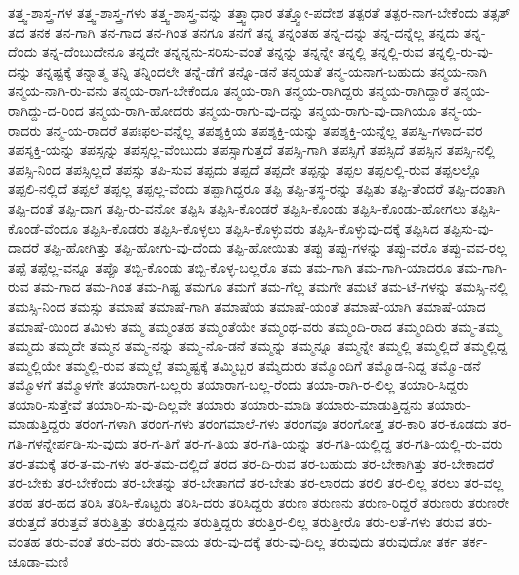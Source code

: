 {ತತ್ತ್ವ-ಶಾಸ್ತ್ರ-ಗಳ
ತತ್ತ್ವ-ಶಾಸ್ತ್ರ-ಗಳು
ತತ್ತ್ವ-ಶಾಸ್ತ್ರ-ವನ್ನು
ತತ್ತ್ವಾಧಾರ
ತತ್ತ್ವೋ-ಪದೇಶ
ತತ್ಪರತೆ
ತತ್ಪರ-ನಾಗ-ಬೇಕೆಂದು
ತತ್ಸತ್
ತದ
ತನಕ
ತನ-ಗಾಗಿ
ತನ-ಗಾದ
ತನ-ಗಿಂತ
ತನಗೂ
ತನಗೆ
ತನ್ನ
ತನ್ನಂತಹ
ತನ್ನ-ದನ್ನು
ತನ್ನ-ದನ್ನೆಲ್ಲ
ತನ್ನದು
ತನ್ನ-ದೆಂದು
ತನ್ನ-ದೆಂಬುದೇನೂ
ತನ್ನದೇ
ತನ್ನನ್ನನು-ಸರಿಸು-ವಂತೆ
ತನ್ನನ್ನು
ತನ್ನನ್ನೇ
ತನ್ನಲ್ಲಿ
ತನ್ನಲ್ಲಿ-ರುವ
ತನ್ನಲ್ಲಿ-ರು-ವು-ದನ್ನು
ತನ್ನಷ್ಟಕ್ಕೆ
ತನ್ನಾತ್ಮ
ತನ್ನಿ
ತನ್ನಿಂದಲೇ
ತನ್ನೆ-ಡೆಗೆ
ತನ್ನೊ-ಡನೆ
ತನ್ಮಯತೆ
ತನ್ಮ-ಯನಾಗ-ಬಹುದು
ತನ್ಮಯ-ನಾಗಿ
ತನ್ಮಯ-ನಾಗಿ-ರು-ವನು
ತನ್ಮಯ-ರಾಗ-ಬೇಕೆಂದೂ
ತನ್ಮಯ-ರಾಗಿ
ತನ್ಮಯ-ರಾಗಿದ್ದರು
ತನ್ಮಯ-ರಾಗಿದ್ದಾರೆ
ತನ್ಮಯ-ರಾಗಿದ್ದು-ದ-ರಿಂದ
ತನ್ಮಯ-ರಾಗಿ-ಹೋದರು
ತನ್ಮಯ-ರಾಗು-ವು-ದನ್ನು
ತನ್ಮಯ-ರಾಗು-ವು-ದಾಗಿಯೂ
ತನ್ಮ-ಯ-ರಾದರು
ತನ್ಮ-ಯ-ರಾದರೆ
ತಪಃಫಲ-ವನ್ನೆಲ್ಲ
ತಪಶ್ಶಕ್ತಿಯ
ತಪಶ್ಶಕ್ತಿ-ಯನ್ನು
ತಪಶ್ಶಕ್ತಿ-ಯನ್ನೆಲ್ಲ
ತಪಸ್ವಿ-ಗಳಾದ-ವರ
ತಪಸ್ಶಕ್ತಿ-ಯನ್ನು
ತಪಸ್ಸನ್ನು
ತಪಸ್ಸಲ್ಲ-ವೆಂಬುದು
ತಪಸ್ಸಾಗುತ್ತದೆ
ತಪಸ್ಸಿ-ಗಾಗಿ
ತಪಸ್ಸಿಗೆ
ತಪಸ್ಸಿದೆ
ತಪಸ್ಸಿನ
ತಪಸ್ಸಿ-ನಲ್ಲಿ
ತಪಸ್ಸಿ-ನಿಂದ
ತಪಸ್ಸಿಲ್ಲದೆ
ತಪಸ್ಸು
ತಪಿ-ಸುವ
ತಪ್ಪದು
ತಪ್ಪದೆ
ತಪ್ಪದೇ
ತಪ್ಪನ್ನು
ತಪ್ಪಲ
ತಪ್ಪಲಲ್ಲಿ-ರುವ
ತಪ್ಪಲಲ್ಲೊ
ತಪ್ಪಲಿ-ನಲ್ಲಿದೆ
ತಪ್ಪಲೆ
ತಪ್ಪಲ್ಲ
ತಪ್ಪಲ್ಲ-ವೆಂದು
ತಪ್ಪಾಗಿದ್ದರೂ
ತಪ್ಪಿ
ತಪ್ಪಿ-ತಸ್ಥ-ರನ್ನು
ತಪ್ಪಿತು
ತಪ್ಪಿ-ತೆಂದರೆ
ತಪ್ಪಿ-ದಂತಾಗಿ
ತಪ್ಪಿ-ದಂತೆ
ತಪ್ಪಿ-ದಾಗ
ತಪ್ಪಿ-ರು-ವನೋ
ತಪ್ಪಿಸಿ
ತಪ್ಪಿಸಿ-ಕೊಂಡರೆ
ತಪ್ಪಿಸಿ-ಕೊಂಡು
ತಪ್ಪಿಸಿ-ಕೊಂಡು-ಹೋಗಲು
ತಪ್ಪಿಸಿ-ಕೊಂಡೆ-ವೆಂದೂ
ತಪ್ಪಿಸಿ-ಕೊಡರು
ತಪ್ಪಿಸಿ-ಕೊಳ್ಳಲು
ತಪ್ಪಿಸಿ-ಕೊಳ್ಳುವರು
ತಪ್ಪಿಸಿ-ಕೊಳ್ಳುವು-ದಕ್ಕೆ
ತಪ್ಪಿಸಿದ
ತಪ್ಪಿಸು-ವು-ದಾದರೆ
ತಪ್ಪಿ-ಹೋಗಿತ್ತು
ತಪ್ಪಿ-ಹೋಗು-ವು-ದೆಂದು
ತಪ್ಪಿ-ಹೋಯಿತು
ತಪ್ಪು
ತಪ್ಪು-ಗಳನ್ನು
ತಪ್ಪು-ವರೊ
ತಪ್ಪು-ವವ-ರಲ್ಲ
ತಪ್ಪೆ
ತಪ್ಪೆಲ್ಲ-ವನ್ನೂ
ತಪ್ಪೊ
ತಬ್ಬಿ-ಕೊಂಡು
ತಬ್ಬಿ-ಕೊಳ್ಳ-ಬಲ್ಲರೊ
ತಮ
ತಮ-ಗಾಗಿ
ತಮ-ಗಾಗಿ-ಯಾದರೂ
ತಮ-ಗಾಗಿ-ರುವ
ತಮ-ಗಾದ
ತಮ-ಗಿಂತ
ತಮ-ಗಿಷ್ಟ
ತಮಗೂ
ತಮಗೆ
ತಮ-ಗೆಲ್ಲ
ತಮಗೇ
ತಮಟೆ
ತಮ-ಟೆ-ಗಳನ್ನು
ತಮಸ್ಸಿ-ನಲ್ಲಿ
ತಮಸ್ಸಿ-ನಿಂದ
ತಮಸ್ಸು
ತಮಾಷೆ
ತಮಾಷೆ-ಗಾಗಿ
ತಮಾಷೆಯ
ತಮಾಷೆ-ಯಂತೆ
ತಮಾಷೆ-ಯಾಗಿ
ತಮಾಷೆ-ಯಾದ
ತಮಾಷೆ-ಯಿಂದ
ತಮಿಳು
ತಮ್ಮ
ತಮ್ಮಂತಹ
ತಮ್ಮಂತೆಯೇ
ತಮ್ಮಂಥ-ವರು
ತಮ್ಮಂದಿ-ರಾದ
ತಮ್ಮಂದಿರು
ತಮ್ಮ-ತಮ್ಮ
ತಮ್ಮದು
ತಮ್ಮದೇ
ತಮ್ಮನ
ತಮ್ಮ-ನನ್ನು
ತಮ್ಮ-ನೊ-ಡನೆ
ತಮ್ಮನ್ನು
ತಮ್ಮನ್ನೂ
ತಮ್ಮನ್ನೇ
ತಮ್ಮಲ್ಲಿ
ತಮ್ಮಲ್ಲಿದೆ
ತಮ್ಮಲ್ಲಿದ್ದ
ತಮ್ಮಲ್ಲಿಯೇ
ತಮ್ಮಲ್ಲಿ-ರುವ
ತಮ್ಮಲ್ಲೆ
ತಮ್ಮಷ್ಟಕ್ಕೆ
ತಮ್ಮಿಬ್ಬರ
ತಮ್ಮೆದುರು
ತಮ್ಮೊಂದಿಗೆ
ತಮ್ಮೊಡ-ನಿದ್ದ
ತಮ್ಮೊ-ಡನೆ
ತಮ್ಮೊಳಗೆ
ತಮ್ಮೊಳಗೇ
ತಯಾರಾಗ-ಬಲ್ಲರು
ತಯಾರಾಗ-ಬಲ್ಲ-ರೆಂದು
ತಯಾ-ರಾಗಿ-ರ-ಲಿಲ್ಲ
ತಯಾರಿ-ಸಿದ್ದರು
ತಯಾರಿ-ಸುತ್ತೇವೆ
ತಯಾರಿ-ಸು-ವು-ದಿಲ್ಲವೇ
ತಯಾರು
ತಯಾರು-ಮಾಡಿ
ತಯಾರು-ಮಾಡುತ್ತಿದ್ದನು
ತಯಾರು-ಮಾಡುತ್ತಿದ್ದರು
ತರಂಗ-ಗಳಾಗಿ
ತರಂಗ-ಗಳು
ತರಂಗಮಾಲೆ-ಗಳು
ತರಂಗವೂ
ತರಂಗೋತ್ತ
ತರ-ಕಾರಿ
ತರ-ಕೂಡದು
ತರ-ಗತಿ-ಗಳನ್ನೇರ್ಪಡಿ-ಸು-ವುದು
ತರ-ಗ-ತಿಗೆ
ತರ-ಗ-ತಿಯ
ತರ-ಗತಿ-ಯನ್ನು
ತರ-ಗತಿ-ಯಲ್ಲಿದ್ದ
ತರ-ಗತಿ-ಯಲ್ಲಿ-ರು-ವರು
ತರ-ತಮಕ್ಕೆ
ತರ-ತ-ಮ-ಗಳು
ತರ-ತಮ-ದಲ್ಲಿದೆ
ತರದ
ತರ-ದಿ-ರುವ
ತರ-ಬಹುದು
ತರ-ಬೇಕಾಗಿತ್ತು
ತರ-ಬೇಕಾದರೆ
ತರ-ಬೇಕು
ತರ-ಬೇಕೆಂದು
ತರ-ಬೇತನ್ನು
ತರ-ಬೇತಾಗದೆ
ತರ-ಬೇತು
ತರ-ಲಾರದು
ತರಲಿ
ತರ-ಲಿಲ್ಲ
ತರಲು
ತರ-ವಲ್ಲ
ತರಹ
ತರ-ಹದ
ತರಿಸಿ
ತರಿಸಿ-ಕೊಟ್ಟರು
ತರಿಸಿ-ದರು
ತರಿಸಿದ್ದರು
ತರುಣ
ತರುಣನು
ತರುಣ-ರಿದ್ದರೆ
ತರುಣರು
ತರುಣರೇ
ತರುತ್ತದೆ
ತರುತ್ತವೆ
ತರುತ್ತಿತ್ತು
ತರುತ್ತಿದ್ದನು
ತರುತ್ತಿದ್ದರು
ತರುತ್ತಿರ-ಲಿಲ್ಲ
ತರುತ್ತೀರೊ
ತರು-ಲತೆ-ಗಳು
ತರುವ
ತರು-ವಂತಹ
ತರು-ವಂತೆ
ತರು-ವರು
ತರು-ವಾಯ
ತರು-ವು-ದಕ್ಕೆ
ತರು-ವು-ದಿಲ್ಲ
ತರುವುದು
ತರುವುದೋ
ತರ್ಕ
ತರ್ಕ-ಚೂಡಾ-ಮಣಿ
}
